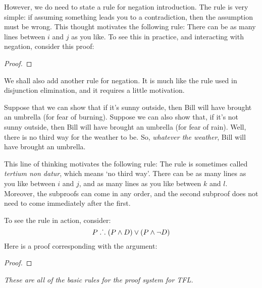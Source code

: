 However, we do need to state a rule for negation introduction. The rule is very simple: if assuming something leads you to a contradiction, then the assumption must be wrong. This thought motivates the following rule:
There can be as many lines between $i$ and $j$ as you like. To see this in practice, and interacting with negation, consider this proof:
	\begin{proof}
		\open
		\close
	\end{proof}
We shall also add another rule for negation. It is much like the rule used in disjunction elimination, and it requires a little motivation. 

Suppose that we can show that if it's sunny outside, then Bill will have brought an umbrella (for fear of burning). Suppose we can also show that, if it's not sunny outside, then Bill will have brought an umbrella (for fear of rain). Well, there is no third way for the weather to be. So, \emph{whatever the weather}, Bill will have brought an umbrella. 

This line of thinking motivates the following rule:
The rule is sometimes called \emph{tertium non datur}, which means `no third way'. There can be as many lines as you like between $i$ and $j$, and as many lines as you like between $k$ and $l$. Moreover, the subproofs can come in any order, and the second subproof does not need to come immediately after the first.

To see the rule in action, consider:
	$$P \mathrel{\ldotp\dot{}\,\ldotp} (P \wedge D) \vee (P \wedge \neg D)$$
Here is a proof corresponding with the argument:
	\begin{proof}
		\open
		\close
		\open
		\close
	\end{proof}
\emph{These are all of the basic rules for the proof system for TFL.}

